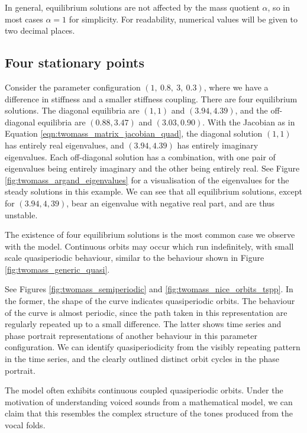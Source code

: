\documentclass{report}
\begin{document}
In general, equilibrium solutions are not affected by the mass quotient $\alpha$, so in most cases $\alpha = 1$ for simplicity.
For readability, numerical values will be given to two decimal places.

\subsection{Four stationary points}

Consider the parameter configuration \((1,~0.8,~3,~0.3)\), where we have a difference in stiffness and a smaller stiffness coupling.
There are four equilibrium solutions.
The diagonal equilibria are \((1,1)\) and \((3.94,4.39)\),
and the off-diagonal equilibria are \((0.88,3.47)\) and \((3.03,0.90)\).
With the Jacobian as in Equation \ref{eqn:twomass_matrix_jacobian_quad},
the diagonal solution \((1,1)\) has entirely real eigenvalues, and \((3.94,4.39)\) has entirely imaginary eigenvalues.
Each off-diagonal solution has a combination, with one pair of eigenvalues being entirely imaginary and the other being entirely real.
See Figure \ref{fig:twomass_argand_eigenvalues} for a visualisation of the eigenvalues for the steady solutions in this example.
We can see that all equilibrium solutions, except for \((3.94,4,39)\), bear an eigenvalue with negative real part, and are thus unstable.  %

The existence of four equilibrium solutions is the most common case we observe with the model.
Continuous orbits may occur which run indefinitely, with small scale quasiperiodic behaviour,
similar to the behaviour shown in Figure \ref{fig:twomass_generic_quasi}.

See Figures \ref{fig:twomass_semiperiodic} and \ref{fig:twomass_nice_orbits_tspp}.
In the former, the shape of the curve indicates quasiperiodic orbits.
The behaviour of the curve is almost periodic, since the path taken in this representation are regularly repeated up to a small difference.
The latter shows time series and phase portrait representations of another behaviour in this parameter configuration.
We can identify quasiperiodicity from the visibly repeating pattern in the time series,
and the clearly outlined distinct orbit cycles in the phase portrait.

The model often exhibits continuous coupled quasiperiodic orbits.
Under the motivation of understanding voiced sounds from a mathematical model,
we can claim that this resembles the complex structure of the tones produced from the vocal folds.
\end{document}

